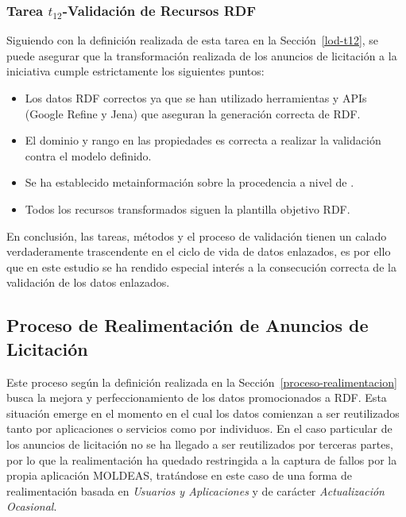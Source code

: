 \subsubsection{Tarea $t_{12}$-Validación de Recursos RDF}
Siguiendo con la definición realizada de esta tarea en la Sección~\ref{lod-t12}, se puede asegurar que la transformación 
realizada de los anuncios de licitación a la iniciativa \linkeddata cumple estrictamente los 
siguientes puntos:

\begin{itemize}
 \item Los datos RDF correctos ya que se han utilizado herramientas y APIs (Google Refine y Jena) que aseguran 
la generación correcta de RDF.
 \item El dominio y rango en las propiedades es correcta a realizar la validación contra el modelo definido.
 \item Se ha establecido metainformación sobre la procedencia a nivel de \dataset.
 \item Todos los recursos transformados siguen la plantilla objetivo RDF.
\end{itemize}
% 
En conclusión, las tareas, métodos y el proceso de validación tienen un calado verdaderamente trascendente 
en el ciclo de vida de datos enlazados, es por ello que en este estudio se ha rendido especial interés 
a la consecución correcta de la validación de los datos enlazados.
% 
\subsection{Proceso de Realimentación de Anuncios de Licitación}
Este proceso según la definición realizada en la Sección~\ref{proceso-realimentacion} busca la mejora 
y perfeccionamiento de los datos promocionados a \gls{RDF}. Esta situación emerge en el momento en el cual 
los datos comienzan a ser reutilizados tanto por aplicaciones o servicios como por individuos. En el caso 
particular de los anuncios de licitación no se ha llegado a ser reutilizados por terceras partes, 
por lo que la realimentación ha quedado restringida a la captura de fallos por la propia aplicación \gls{MOLDEAS}, 
tratándose en este caso de una forma de realimentación basada en \textit{Usuarios y Aplicaciones} 
y de carácter \textit{Actualización Ocasional}.


